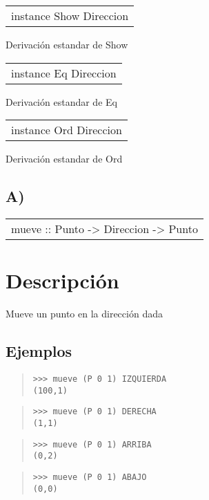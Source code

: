 \begin{haddockdesc}
\item[\begin{tabular}{@{}l}
instance Show Direccion
\end{tabular}]
{\haddockbegindoc
Derivación estandar de Show\par}
\end{haddockdesc}
\begin{haddockdesc}
\item[\begin{tabular}{@{}l}
instance Eq Direccion
\end{tabular}]
{\haddockbegindoc
Derivación estandar de Eq\par}
\end{haddockdesc}
\begin{haddockdesc}
\item[\begin{tabular}{@{}l}
instance Ord Direccion
\end{tabular}]
{\haddockbegindoc
Derivación estandar de Ord\par}
\end{haddockdesc}
\subsection{A)}
\begin{haddockdesc}
\item[\begin{tabular}{@{}l}
mueve :: Punto -> Direccion -> Punto
\end{tabular}]
{\haddockbegindoc
\section*{Descripción}
Mueve un punto en la dirección dada\par
\subsection*{Ejemplos}
\begin{quote}
{\haddockverb\begin{verbatim}
>>> mueve (P 0 1) IZQUIERDA
(100,1)

\end{verbatim}}
\end{quote}
\begin{quote}
{\haddockverb\begin{verbatim}
>>> mueve (P 0 1) DERECHA
(1,1)

\end{verbatim}}
\end{quote}
\begin{quote}
{\haddockverb\begin{verbatim}
>>> mueve (P 0 1) ARRIBA
(0,2)

\end{verbatim}}
\end{quote}
\begin{quote}
{\haddockverb\begin{verbatim}
>>> mueve (P 0 1) ABAJO
(0,0)

\end{verbatim}}
\end{quote}}
\end{haddockdesc}
